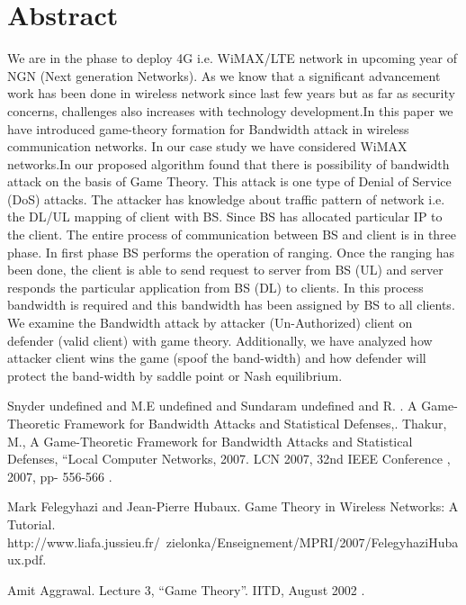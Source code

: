 \documentclass[article,A4,11pt]{llncs}%
\begin{document}
\section*{Abstract}
We are in the phase to deploy 4G i.e. WiMAX/LTE network in upcoming year of NGN (Next generation Networks). As we know that a significant advancement work has been done in wireless network since last few years but as far as security concerns, challenges also increases with technology development.In this paper we have introduced game-theory formation for Bandwidth attack in wireless communication networks. In our case study we have considered WiMAX networks.In our proposed algorithm found that there is possibility of bandwidth attack on the basis of Game Theory. This attack is one type of Denial of Service (DoS) attacks. The attacker has knowledge about traffic pattern of network i.e. the DL/UL mapping of client with BS. Since BS has allocated particular IP to the client. The entire process of communication between BS and client is in three phase. In first phase BS performs the operation of ranging. Once the ranging has been done, the client is able to send request to server from BS (UL) and server responds the particular application from BS (DL) to clients. In this process bandwidth is required and this bandwidth has been assigned by BS to all clients. We examine the Bandwidth attack by attacker (Un-Authorized) client on defender (valid client) with game theory. Additionally, we have analyzed how attacker client wins the game (spoof the band-width) and how defender will protect the band-width by saddle point or Nash equilibrium.


\begin{thebibliography}{10}
{\sc Snyder undefined and M.E undefined and Sundaram undefined and R. }. {A Game-Theoretic Framework for Bandwidth Attacks and Statistical Defenses,}. Thakur, M., A Game-Theoretic Framework for Bandwidth Attacks and Statistical Defenses, “Local Computer Networks, 2007. LCN 2007, 32nd IEEE Conference , 2007, pp- 556-566 .

{\sc Mark Felegyhazi and Jean-Pierre Hubaux}. {Game Theory in Wireless Networks: A Tutorial}. http://www.liafa.jussieu.fr/~zielonka/Enseignement/MPRI/2007/FelegyhaziHubaux.pdf.

{\sc Amit Aggrawal}. {Lecture 3, “Game Theory”}. IITD, August 2002 .
\end{thebibliography}
\end{document}
